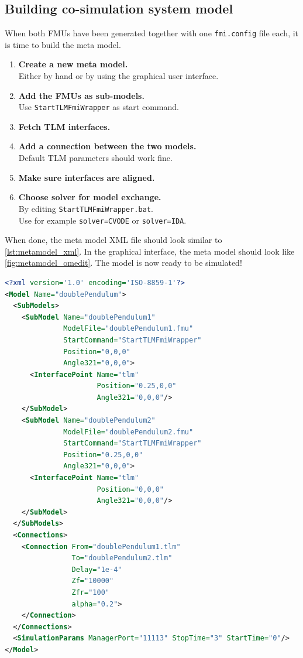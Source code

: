 \documentclass[a4paper,12pt]{include/opencpsreport}
\begin{document}
\FloatBarrier
\subsection{Building co-simulation system model}

When both FMUs have been generated together with one \texttt{fmi.config} file each, it is time to build the meta model.
\begin{enumerate}
\item \textbf{Create a new meta model.}\\
             Either by hand or by using the graphical user interface.
\item \textbf{Add the FMUs as sub-models.}\\
              Use \texttt{StartTLMFmiWrapper} as start command.
\item \textbf{Fetch TLM interfaces.}
\item \textbf{Add a connection between the two models.}\\
              Default TLM parameters should work fine.
\item \textbf{Make sure interfaces are aligned.}
\item \textbf{Choose solver for model exchange.}\\
              By editing \texttt{StartTLMFmiWrapper.bat}.\\
              Use for example \texttt{solver=CVODE} or \texttt{solver=IDA}.
\end{enumerate}

When done, the meta model XML file should look similar to \cref{lst:metamodel_xml}.
In the graphical interface, the meta model should look like \cref{fig:metamodel_omedit}.
The model is now ready to be simulated!

\begin{lstlisting}[language=xml,float,floatplacement=ht,label={lst:metamodel_xml},caption=XML description of the complete meta model]
<?xml version='1.0' encoding='ISO-8859-1'?>
<Model Name="doublePendulum">
  <SubModels>
    <SubModel Name="doublePendulum1" 
              ModelFile="doublePendulum1.fmu"
              StartCommand="StartTLMFmiWrapper" 
              Position="0,0,0" 
              Angle321="0,0,0">
      <InterfacePoint Name="tlm" 
                      Position="0.25,0,0" 
                      Angle321="0,0,0"/>
    </SubModel>
    <SubModel Name="doublePendulum2" 
              ModelFile="doublePendulum2.fmu" 
              StartCommand="StartTLMFmiWrapper" 
              Position="0.25,0,0"  
              Angle321="0,0,0">
      <InterfacePoint Name="tlm" 
                      Position="0,0,0" 
                      Angle321="0,0,0"/>
    </SubModel>
  </SubModels>
  <Connections>
    <Connection From="doublePendulum1.tlm" 
                To="doublePendulum2.tlm" 
                Delay="1e-4" 
                Zf="10000"   
                Zfr="100"
                alpha="0.2">
    </Connection>
  </Connections>
  <SimulationParams ManagerPort="11113" StopTime="3" StartTime="0"/>
</Model>
\end{lstlisting}
\end{document}
